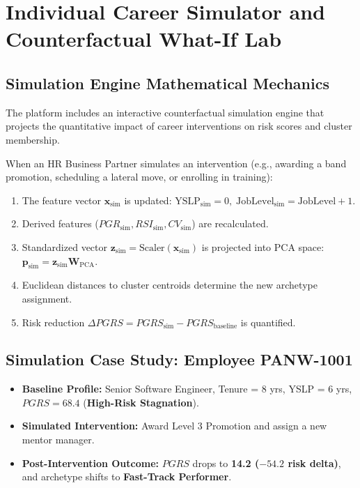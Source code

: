 \documentclass[12pt,a4paper,oneside]{article}
\begin{document}
\section{Individual Career Simulator and Counterfactual What-If Lab}

\subsection{Simulation Engine Mathematical Mechanics}
The platform includes an interactive counterfactual simulation engine that projects the quantitative impact of career interventions on risk scores and cluster membership.

When an HR Business Partner simulates an intervention (e.g., awarding a band promotion, scheduling a lateral move, or enrolling in training):
\begin{enumerate}
  \item The feature vector $\mathbf{x}_{\text{sim}}$ is updated: $\text{YSLP}_{\text{sim}} = 0, \; \text{JobLevel}_{\text{sim}} = \text{JobLevel} + 1$.
  \item Derived features ($PGR_{\text{sim}}, RSI_{\text{sim}}, CV_{\text{sim}}$) are recalculated.
  \item Standardized vector $\mathbf{z}_{\text{sim}} = \text{Scaler}(\mathbf{x}_{\text{sim}})$ is projected into PCA space: $\mathbf{p}_{\text{sim}} = \mathbf{z}_{\text{sim}} \mathbf{W}_{\text{PCA}}$.
  \item Euclidean distances to cluster centroids determine the new archetype assignment.
  \item Risk reduction $\Delta PGRS = PGRS_{\text{sim}} - PGRS_{\text{baseline}}$ is quantified.
\end{enumerate}

\subsection{Simulation Case Study: Employee PANW-1001}
\begin{itemize}
  \item \textbf{Baseline Profile:} Senior Software Engineer, Tenure = 8 yrs, YSLP = 6 yrs, $PGRS = 68.4$ (\textbf{High-Risk Stagnation}).
  \item \textbf{Simulated Intervention:} Award Level 3 Promotion and assign a new mentor manager.
  \item \textbf{Post-Intervention Outcome:} $PGRS$ drops to \textbf{14.2 ($-54.2$ risk delta)}, and archetype shifts to \textbf{Fast-Track Performer}.
\end{itemize}
\end{document}
